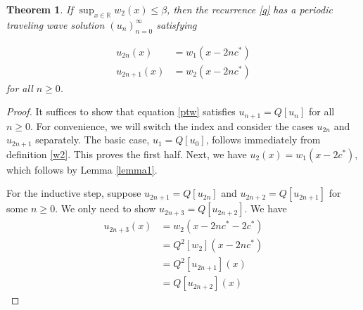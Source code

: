 \documentclass[11pt]{article}
\newtheorem{thm}{Theorem}
\theoremstyle{definition}
\numberwithin{equation}{section}
\numberwithin{thm}{section}
\renewcommand{\b}{\beta}
\begin{document}
\begin{thm} \label{theorem1}
If $\sup_{x\in\mathbb R}w_2(x)\leq \b$, then the recurrence \eqref{q} has a periodic traveling wave solution $(u_n)_{n=0}^{\infty}$ satisfying

\begin{equation} \label{ptw}
\begin{aligned}
u_{2n}(x) &= w_1(x-2nc^*) \\
u_{2n+1}(x) &= w_2(x-2nc^*)
\end{aligned}
\end{equation}
for all $n \geq 0$.
\end{thm}

\begin{proof}
It suffices to show that equation \eqref{ptw} satisfies $u_{n+1}=Q[u_n]$ for all $n \geq 0$. For convenience, we will switch the index and consider the cases $u_{2n}$ and $u_{2n+1}$ separately. The basic case, $u_1 = Q[u_0]$, follows immediately from definition \ref{w2}. This proves the first half. Next, we have $u_2(x)=w_1(x-2c^*)$, which follows by Lemma \ref{lemma1}.

For the inductive step, suppose $u_{2n+1}=Q[u_{2n}]$ and $u_{2n+2}=Q[u_{2n+1}]$ for some $n\geq 0$. We only need to show $u_{2n+3}=Q[u_{2n+2}]$. We have
\begin{equation} \begin{aligned}
u_{2n+3}(x) &= w_2(x-2nc^*-2c^*) \\
&= Q^2[w_2](x-2nc^*) \\
&= Q^2[u_{2n+1}](x) \\ 
&= Q[u_{2n+2}](x)
\end{aligned} \end{equation}
\end{proof}
\end{document}

